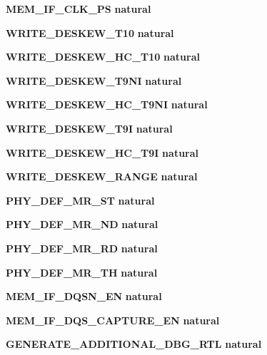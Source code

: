 \begin{DoxyCompactItemize}
{\bf M\+E\+M\+\_\+\+I\+F\+\_\+\+C\+L\+K\+\_\+\+PS} {\bfseries {\bfseries \textcolor{comment}{natural}\textcolor{vhdlchar}{ }}}
\item 
{\bf W\+R\+I\+T\+E\+\_\+\+D\+E\+S\+K\+E\+W\+\_\+\+T10} {\bfseries {\bfseries \textcolor{comment}{natural}\textcolor{vhdlchar}{ }}}
\item 
{\bf W\+R\+I\+T\+E\+\_\+\+D\+E\+S\+K\+E\+W\+\_\+\+H\+C\+\_\+\+T10} {\bfseries {\bfseries \textcolor{comment}{natural}\textcolor{vhdlchar}{ }}}
\item 
{\bf W\+R\+I\+T\+E\+\_\+\+D\+E\+S\+K\+E\+W\+\_\+\+T9\+NI} {\bfseries {\bfseries \textcolor{comment}{natural}\textcolor{vhdlchar}{ }}}
\item 
{\bf W\+R\+I\+T\+E\+\_\+\+D\+E\+S\+K\+E\+W\+\_\+\+H\+C\+\_\+\+T9\+NI} {\bfseries {\bfseries \textcolor{comment}{natural}\textcolor{vhdlchar}{ }}}
\item 
{\bf W\+R\+I\+T\+E\+\_\+\+D\+E\+S\+K\+E\+W\+\_\+\+T9I} {\bfseries {\bfseries \textcolor{comment}{natural}\textcolor{vhdlchar}{ }}}
\item 
{\bf W\+R\+I\+T\+E\+\_\+\+D\+E\+S\+K\+E\+W\+\_\+\+H\+C\+\_\+\+T9I} {\bfseries {\bfseries \textcolor{comment}{natural}\textcolor{vhdlchar}{ }}}
\item 
{\bf W\+R\+I\+T\+E\+\_\+\+D\+E\+S\+K\+E\+W\+\_\+\+R\+A\+N\+GE} {\bfseries {\bfseries \textcolor{comment}{natural}\textcolor{vhdlchar}{ }}}
\item 
{\bf P\+H\+Y\+\_\+\+D\+E\+F\+\_\+\+M\+R\+\_\+ST} {\bfseries {\bfseries \textcolor{comment}{natural}\textcolor{vhdlchar}{ }}}
\item 
{\bf P\+H\+Y\+\_\+\+D\+E\+F\+\_\+\+M\+R\+\_\+ND} {\bfseries {\bfseries \textcolor{comment}{natural}\textcolor{vhdlchar}{ }}}
\item 
{\bf P\+H\+Y\+\_\+\+D\+E\+F\+\_\+\+M\+R\+\_\+RD} {\bfseries {\bfseries \textcolor{comment}{natural}\textcolor{vhdlchar}{ }}}
\item 
{\bf P\+H\+Y\+\_\+\+D\+E\+F\+\_\+\+M\+R\+\_\+TH} {\bfseries {\bfseries \textcolor{comment}{natural}\textcolor{vhdlchar}{ }}}
\item 
{\bf M\+E\+M\+\_\+\+I\+F\+\_\+\+D\+Q\+S\+N\+\_\+\+EN} {\bfseries {\bfseries \textcolor{comment}{natural}\textcolor{vhdlchar}{ }}}
\item 
{\bf M\+E\+M\+\_\+\+I\+F\+\_\+\+D\+Q\+S\+\_\+\+C\+A\+P\+T\+U\+R\+E\+\_\+\+EN} {\bfseries {\bfseries \textcolor{comment}{natural}\textcolor{vhdlchar}{ }}}
\item 
{\bf G\+E\+N\+E\+R\+A\+T\+E\+\_\+\+A\+D\+D\+I\+T\+I\+O\+N\+A\+L\+\_\+\+D\+B\+G\+\_\+\+R\+TL} {\bfseries {\bfseries \textcolor{comment}{natural}\textcolor{vhdlchar}{ }}}

\end{DoxyCompactItemize}
